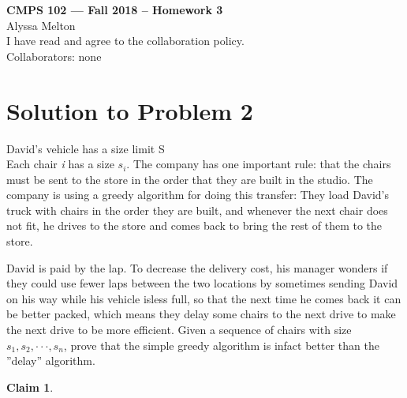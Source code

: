 \documentclass[11pt]{article}
\newtheorem{claim}[theorem]{Claim}
\begin{document}
	
	\begin{center}
		{\bf\Large CMPS 102 --- Fall 2018 --  Homework 3}\\
		Alyssa Melton\\
		I have read and agree to the collaboration policy. \\
		Collaborators: none\\
	\end{center}
	
	
	\section*{Solution to Problem 2}
		David’s vehicle has a size limit S\\
		Each chair \textit{i} has a size $s_i$.  
		The company has one important rule: 
		that the chairs must be sent to the store in the order that they are built in the studio. 
		The  company  is  using  a  greedy  algorithm  for  doing  this  transfer:  
		They  load  David’s truck with chairs in the order they are built, and whenever the next chair does not fit, he drives to the store and comes back to bring the rest of them to the store.
		 
		David is paid by the lap.  
		To decrease the delivery cost, his manager wonders if they could use fewer laps 
		between the two locations by sometimes sending David on his way while his vehicle isless full, 
		so that the next time he comes back it can be better packed, 
		which means they delay some chairs to the next drive to make the next drive to be more efficient.
		Given a sequence of chairs with size $s_1, s_2, ···, s_n$, prove that the simple greedy algorithm is infact better than the ”delay” algorithm.
	
	\begin{claim} 
		
		
	\end{claim}
\end{document}
